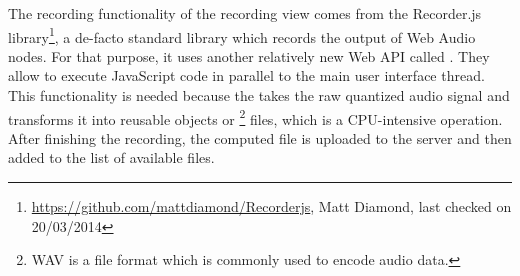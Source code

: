 The recording functionality of the recording view comes from the Recorder.js library\footnote{\url{https://github.com/mattdiamond/Recorderjs}, Matt Diamond, last checked on 20/03/2014}, a de-facto standard library which records the output of Web Audio nodes. For that purpose, it uses another relatively new Web API called . They allow to execute JavaScript code in parallel to the main user interface thread. This functionality is needed because the  takes the raw quantized audio signal and transforms it into reusable  objects or \footnote{WAV is a file format which is commonly used to encode audio data.} files, which is a CPU-intensive operation. After finishing the recording, the computed  file is uploaded to the server and then added to the list of available files.
